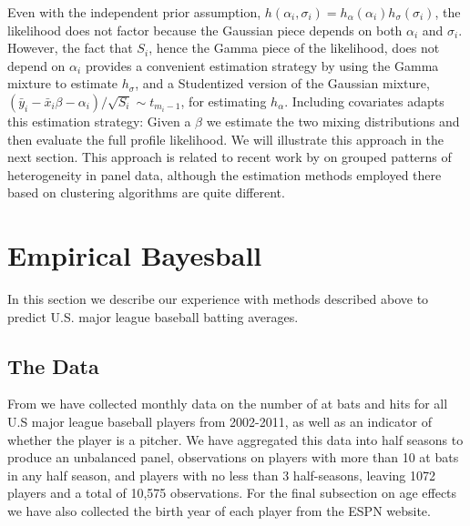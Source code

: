 \documentclass[12pt]{amsart}
\begin{document}
Even with the independent prior assumption,  
$h(\alpha_{i}, \sigma_{i}) = h_\alpha(\alpha_{i}) h_{\sigma}(\sigma_{i})$, 
the likelihood does not factor because the Gaussian piece depends on both $\alpha_{i}$ and 
$\sigma_{i}$. However, the fact that $S_{i}$, hence the Gamma piece of the likelihood, 
does not depend on $\alpha_{i}$ provides a convenient estimation strategy by using the Gamma 
mixture to estimate $h_{\sigma}$, and a Studentized version of the Gaussian mixture, 
$(\bar y_{i} - \bar x_{i} \beta - \alpha_{i})/\sqrt{S_{i}} \sim t_{m_{i}-1}$, 
for estimating $h_{\alpha}$. Including covariates adapts this estimation strategy:
Given a $\beta$ we estimate the two mixing distributions and then evaluate the full profile
likelihood.  We will illustrate this approach in the next section.
This approach is related to  recent work by  on grouped patterns of
heterogeneity in panel data, although the estimation methods employed there based
on clustering algorithms are quite different.
 
\section{Empirical Bayesball}
In this section we describe our experience with methods described above to 
predict U.S. major league baseball batting averages.  

\subsection{The Data}
From  we have collected monthly data on the number of at bats
and hits for all U.S major league baseball players from 2002-2011, as well as
an indicator of whether the player is a pitcher.  We have aggregated this data
into half seasons to produce an unbalanced panel, observations
on players with more than 10 at bats in any half season,  and players with no less 
than 3 half-seasons,  leaving 1072 players and a total of 10,575 observations.
For the final subsection on age effects we have also collected the birth year of each player
from the ESPN website.
\end{document}
